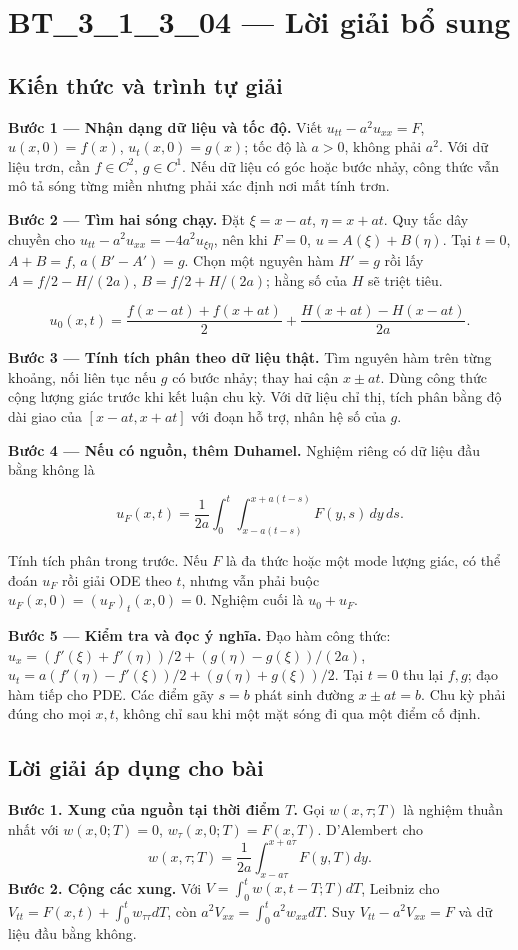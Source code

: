 \documentclass[10pt,a4paper]{article}
\begin{document}
\section*{BT\_3\_1\_3\_04 — Lời giải bổ sung}
\subsection*{Kiến thức và trình tự giải}
\textbf{Bước 1 — Nhận dạng dữ liệu và tốc độ.} Viết $u_{tt}-a^2u_{xx}=F$, $u(x,0)=f(x)$, $u_t(x,0)=g(x)$; tốc độ là $a>0$, không phải $a^2$. Với dữ liệu trơn, cần $f\in C^2$, $g\in C^1$. Nếu dữ liệu có góc hoặc bước nhảy, công thức vẫn mô tả sóng từng miền nhưng phải xác định nơi mất tính trơn.

\textbf{Bước 2 — Tìm hai sóng chạy.} Đặt $\xi=x-at$, $\eta=x+at$. Quy tắc dây chuyền cho $u_{tt}-a^2u_{xx}=-4a^2u_{\xi\eta}$, nên khi $F=0$, $u=A(\xi)+B(\eta)$. Tại $t=0$, $A+B=f$, $a(B'-A')=g$. Chọn một nguyên hàm $H'=g$ rồi lấy $A=f/2-H/(2a)$, $B=f/2+H/(2a)$; hằng số của $H$ sẽ triệt tiêu.


\[
u_0(x,t)=\frac{f(x-at)+f(x+at)}2+\frac{H(x+at)-H(x-at)}{2a}.
\]


\textbf{Bước 3 — Tính tích phân theo dữ liệu thật.} Tìm nguyên hàm trên từng khoảng, nối liên tục nếu $g$ có bước nhảy; thay hai cận $x\pm at$. Dùng công thức cộng lượng giác trước khi kết luận chu kỳ. Với dữ liệu chỉ thị, tích phân bằng độ dài giao của $[x-at,x+at]$ với đoạn hỗ trợ, nhân hệ số của $g$.

\textbf{Bước 4 — Nếu có nguồn, thêm Duhamel.} Nghiệm riêng có dữ liệu đầu bằng không là


\[
u_F(x,t)=\frac1{2a}\int_0^t\int_{x-a(t-s)}^{x+a(t-s)}F(y,s)\,dy\,ds.
\]


Tính tích phân trong trước. Nếu $F$ là đa thức hoặc một mode lượng giác, có thể đoán $u_F$ rồi giải ODE theo $t$, nhưng vẫn phải buộc $u_F(x,0)=(u_F)_t(x,0)=0$. Nghiệm cuối là $u_0+u_F$.

\textbf{Bước 5 — Kiểm tra và đọc ý nghĩa.} Đạo hàm công thức: $u_x=(f'(\xi)+f'(\eta))/2+(g(\eta)-g(\xi))/(2a)$, $u_t=a(f'(\eta)-f'(\xi))/2+(g(\eta)+g(\xi))/2$. Tại $t=0$ thu lại $f,g$; đạo hàm tiếp cho PDE. Các điểm gãy $s=b$ phát sinh đường $x\pm at=b$. Chu kỳ phải đúng cho mọi $x,t$, không chỉ sau khi một mặt sóng đi qua một điểm cố định.
\subsection*{Lời giải áp dụng cho bài}
\textbf{Bước 1. Xung của nguồn tại thời điểm $T$.} Gọi $w(x,\tau;T)$ là nghiệm thuần nhất với $w(x,0;T)=0$, $w_\tau(x,0;T)=F(x,T)$. D'Alembert cho
\[w(x,\tau;T)=\frac1{2a}\int_{x-a\tau}^{x+a\tau}F(y,T)dy.\]
\textbf{Bước 2. Cộng các xung.} Với $V=\int_0^t w(x,t-T;T)dT$, Leibniz cho $V_{tt}=F(x,t)+\int_0^t w_{\tau\tau}dT$, còn $a^2V_{xx}=\int_0^ta^2w_{xx}dT$. Suy $V_{tt}-a^2V_{xx}=F$ và dữ liệu đầu bằng không.
\end{document}
